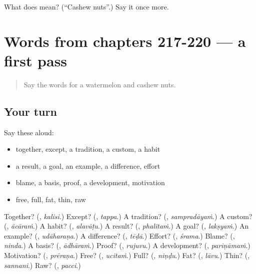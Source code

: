 \begin{tcolorbox}[breakable,colback=teal!4,colframe=teal!35!black,title={Before you move on}]
What does  mean? (\textquotedblleft{}Cashew nuts\textquotedblright{}.) Say it once more.
\end{tcolorbox}
\section[(dialogue)]{Words from chapters 217-220 — a first pass}

\label{lesson:TE-R225-first-pass-words-from-chapters-217-220}



\begin{quote}
Say the words for a watermelon and cashew nuts.
\end{quote}

\subsection*{Your turn}
Say these aloud:

\begin{itemize}
\raggedright
  \item together, except, a tradition, a custom, a habit
  \item a result, a goal, an example, a difference, effort
  \item blame, a basis, proof, a development, motivation
  \item free, full, fat, thin, raw
\end{itemize}

\begin{tcolorbox}[breakable,colback=teal!4,colframe=teal!35!black,title={Before you move on}]
Together? (\textbf{}, \emph{kalisi}.) Except? (\textbf{}, \emph{tappa}.) A tradition? (\textbf{}, \emph{sampradāyaṁ}.) A custom? (\textbf{}, \emph{ācāraṁ}.) A habit? (\textbf{}, \emph{alavāṭu}.) A result? (\textbf{}, \emph{phalitaṁ}.) A goal? (\textbf{}, \emph{lakṣyaṁ}.) An example? (\textbf{}, \emph{udāharaṇa}.) A difference? (\textbf{}, \emph{tēḍā}.) Effort? (\textbf{}, \emph{śrama}.) Blame? (\textbf{}, \emph{ninda}.) A basis? (\textbf{}, \emph{ādhāraṁ}.) Proof? (\textbf{}, \emph{rujuvu}.) A development? (\textbf{}, \emph{pariṇāmaṁ}.) Motivation? (\textbf{}, \emph{prēraṇa}.) Free? (\textbf{}, \emph{ucitaṁ}.) Full? (\textbf{}, \emph{niṇḍu}.) Fat? (\textbf{}, \emph{lāvu}.) Thin? (\textbf{}, \emph{sannani}.) Raw? (\textbf{}, \emph{pacci}.)
\end{tcolorbox}

